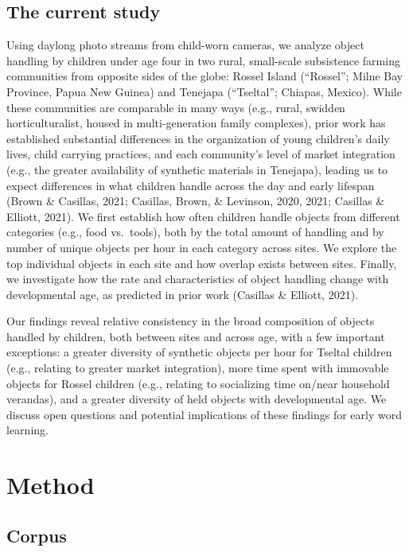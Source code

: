 \documentclass[10pt, letterpaper]{article}
\begin{document}
\hypertarget{the-current-study}{%
\subsection{The current study}\label{the-current-study}}

Using daylong photo streams from child-worn cameras, we analyze object
handling by children under age four in two rural, small-scale
subsistence farming communities from opposite sides of the globe: Rossel
Island (``Rossel''; Milne Bay Province, Papua New Guinea) and Tenejapa
(``Tseltal''; Chiapas, Mexico). While these communities are comparable
in many ways (e.g., rural, swidden horticulturalist, housed in
multi-generation family complexes), prior work has established
substantial differences in the organization of young children's daily
lives, child carrying practices, and each community's level of market
integration (e.g., the greater availability of synthetic materials in
Tenejapa), leading us to expect differences in what children handle
across the day and early lifespan (Brown \& Casillas, 2021; Casillas,
Brown, \& Levinson, 2020, 2021; Casillas \& Elliott, 2021). We first
establish how often children handle objects from different categories
(e.g., food vs.~tools), both by the total amount of handling and by
number of unique objects per hour in each category across sites. We
explore the top individual objects in each site and how overlap exists
between sites. Finally, we investigate how the rate and characteristics
of object handling change with developmental age, as predicted in prior
work (Casillas \& Elliott, 2021).

Our findings reveal relative consistency in the broad composition of
objects handled by children, both between sites and across age, with a
few important exceptions: a greater diversity of synthetic objects per
hour for Tseltal children (e.g., relating to greater market
integration), more time spent with immovable objects for Rossel children
(e.g., relating to socializing time on/near household verandas), and a
greater diversity of held objects with developmental age. We discuss
open questions and potential implications of these findings for early
word learning.

\hypertarget{method}{%
\section{Method}\label{method}}

\hypertarget{corpus}{%
\subsection{Corpus}\label{corpus}}
\end{document}
